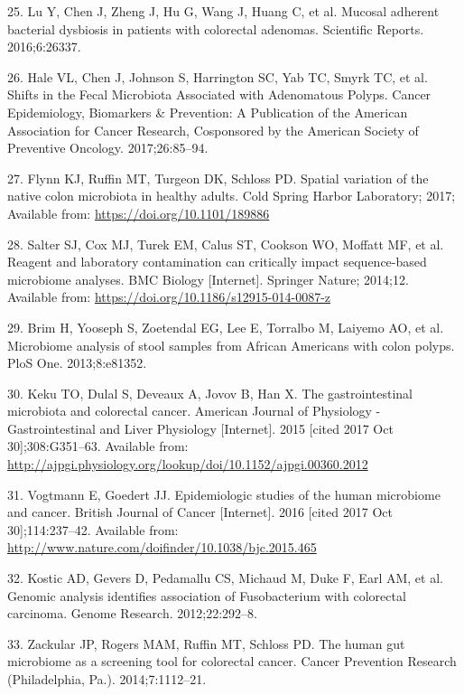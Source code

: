 \documentclass[12pt,]{article}
\begin{document}
\hypertarget{ref-lu_mucosal_2016}{}
25. Lu Y, Chen J, Zheng J, Hu G, Wang J, Huang C, et al. Mucosal
adherent bacterial dysbiosis in patients with colorectal adenomas.
Scientific Reports. 2016;6:26337.

\hypertarget{ref-hale_shifts_2017}{}
26. Hale VL, Chen J, Johnson S, Harrington SC, Yab TC, Smyrk TC, et al.
Shifts in the Fecal Microbiota Associated with Adenomatous Polyps.
Cancer Epidemiology, Biomarkers \& Prevention: A Publication of the
American Association for Cancer Research, Cosponsored by the American
Society of Preventive Oncology. 2017;26:85--94.

\hypertarget{ref-Flynn_preprint_2017}{}
27. Flynn KJ, Ruffin MT, Turgeon DK, Schloss PD. Spatial variation of
the native colon microbiota in healthy adults. Cold Spring Harbor
Laboratory; 2017; Available from: \url{https://doi.org/10.1101/189886}

\hypertarget{ref-Salter_contamination_2014}{}
28. Salter SJ, Cox MJ, Turek EM, Calus ST, Cookson WO, Moffatt MF, et
al. Reagent and laboratory contamination can critically impact
sequence-based microbiome analyses. BMC Biology {[}Internet{]}. Springer
Nature; 2014;12. Available from:
\url{https://doi.org/10.1186/s12915-014-0087-z}

\hypertarget{ref-brim_microbiome_2013}{}
29. Brim H, Yooseph S, Zoetendal EG, Lee E, Torralbo M, Laiyemo AO, et
al. Microbiome analysis of stool samples from African Americans with
colon polyps. PloS One. 2013;8:e81352.

\hypertarget{ref-keku_gastrointestinal_2015}{}
30. Keku TO, Dulal S, Deveaux A, Jovov B, Han X. The gastrointestinal
microbiota and colorectal cancer. American Journal of Physiology -
Gastrointestinal and Liver Physiology {[}Internet{]}. 2015 {[}cited 2017
Oct 30{]};308:G351--63. Available from:
\url{http://ajpgi.physiology.org/lookup/doi/10.1152/ajpgi.00360.2012}

\hypertarget{ref-vogtmann_epidemiologic_2016}{}
31. Vogtmann E, Goedert JJ. Epidemiologic studies of the human
microbiome and cancer. British Journal of Cancer {[}Internet{]}. 2016
{[}cited 2017 Oct 30{]};114:237--42. Available from:
\url{http://www.nature.com/doifinder/10.1038/bjc.2015.465}

\hypertarget{ref-kostic_genomic_2012}{}
32. Kostic AD, Gevers D, Pedamallu CS, Michaud M, Duke F, Earl AM, et
al. Genomic analysis identifies association of Fusobacterium with
colorectal carcinoma. Genome Research. 2012;22:292--8.

\hypertarget{ref-zackular_human_2014}{}
33. Zackular JP, Rogers MAM, Ruffin MT, Schloss PD. The human gut
microbiome as a screening tool for colorectal cancer. Cancer Prevention
Research (Philadelphia, Pa.). 2014;7:1112--21.
\end{document}
